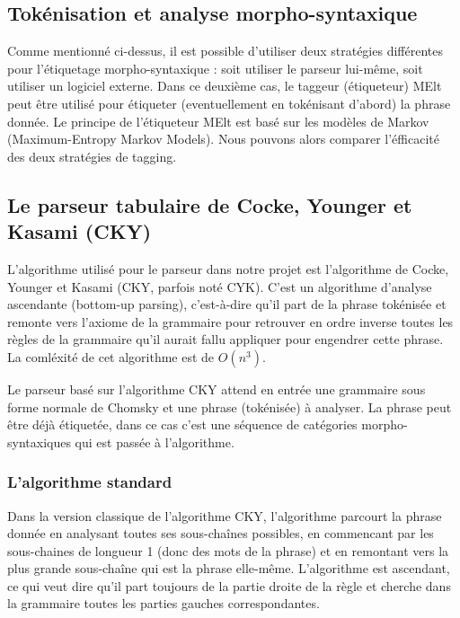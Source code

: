 \documentclass[12pt]{article}
\begin{document}
\subsection{Tok\'enisation et analyse morpho-syntaxique}

Comme mentionn\'e ci-dessus, il est possible d'utiliser deux strat\'egies
diff\'erentes pour l'\'etiquetage morpho-syntaxique : soit utiliser le parseur
lui-m\^eme, soit utiliser un logiciel externe. Dans ce deuxi\`eme cas, le taggeur
(\'etiqueteur) MElt \cite{MElt} peut \^etre utilis\'e pour \'etiqueter (eventuellement
en tok\'enisant d'abord) la phrase donn\'ee. Le principe de l'\'etiqueteur MElt est
bas\'e sur les mod\`eles de Markov (Maximum-Entropy Markov Models).
Nous pouvons alors comparer l'\'efficacit\'e des deux strat\'egies de tagging.

\subsection{Le parseur tabulaire de Cocke, Younger et Kasami (CKY)}

L'algorithme utilis\'e pour le parseur dans notre projet est l'algorithme de
Cocke, Younger et Kasami (CKY, parfois not\'e CYK). C'est un algorithme d'analyse
ascendante (bottom-up parsing), c'est-\`a-dire qu'il part de la phrase tok\'enis\'ee
et remonte vers l'axiome de la grammaire pour retrouver en ordre inverse toutes les r\`egles de la grammaire qu'il
aurait fallu appliquer pour engendrer cette phrase. La coml\'exit\'e de cet
algorithme est de $O(n^3)$. \par

Le parseur bas\'e sur l'algorithme CKY attend en entr\'ee une grammaire sous
forme normale de Chomsky et une phrase (tok\'enis\'ee) \`a analyser. La phrase peut \^etre
d\'ej\`a \'etiquet\'ee, dans ce cas c'est une s\'equence de cat\'egories
morpho-syntaxiques qui est pass\'ee \`a l'algorithme.

\subsubsection{L'algorithme standard}
Dans la version classique de l'algorithme CKY, l'algorithme parcourt la phrase
donn\'ee en analysant toutes ses sous-cha\^ines possibles, en commencant par les
sous-chaines de longueur 1 (donc des mots de la phrase) et en remontant vers la
plus grande sous-cha\^ine qui est la phrase elle-m\^eme. L'algorithme est
ascendant, ce qui veut dire qu'il part toujours de la partie droite de la
r\`egle et cherche dans la grammaire toutes les parties gauches correspondantes. \par
\end{document}
